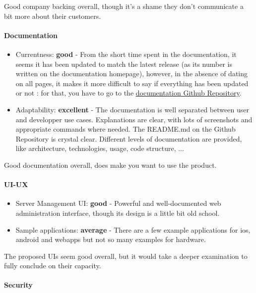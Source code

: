 \documentclass{article}
\begin{document}
Good company backing overall, though it's a shame they don't communicate a bit more about their customers.

\paragraph{Documentation}

\begin{itemize}
\item Currentness: \textbf{good} - From the short time spent in the documentation, it seems it has been updated to match the latest release (as its number is written on the documentation homepage), however, in the absence of dating on all pages, it makes it more difficult to say if everything has been updated or not : for that, you have to go to the \href{https://github.com/sitewhere/sitewhere-documentation/}{documentation Github Repository}.
\item Adaptability: \textbf{excellent} - The documentation is well separated between user and developper use cases. Explanations are clear, with lots of screenshots and appropriate commands where needed. The README.md on the Github Repository is crystal clear. Different levels of documentation are provided, like architecture, technologies, usage, code structure, ...
\end{itemize}

Good documentation overall, does make you want to use the product.

\paragraph{UI-UX}

\begin{itemize}
\item Server Management UI: \textbf{good} - Powerful and well-documented web administration interface, though its design is a little bit old school.
\item Sample applications: \textbf{average} - There are a few example applications for ios, android and webapps but not so many examples for hardware.
\end{itemize}

The proposed UIs seem good overall, but it would take a deeper examination to fully conclude on their capacity.

\paragraph{Security} 
\end{document}
